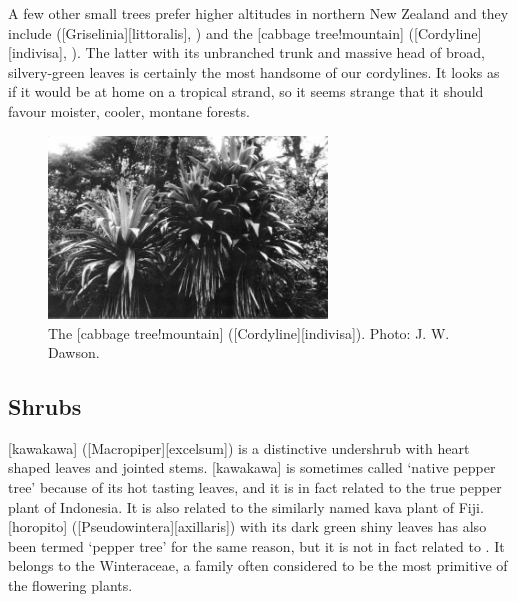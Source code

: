 A few other small trees prefer higher altitudes in northern New Zealand and they include  ([Griselinia][littoralis], ) and the [cabbage tree!mountain] ([Cordyline][indivisa], ).
The latter with its unbranched trunk and massive head of broad, silvery-green leaves is certainly the most handsome of our cordylines.
It looks as if it would be at home on a tropical strand, so it seems strange that it should favour moister, cooler, montane forests.

\begin{figure}
	\includegraphics[width=0.66\textwidth]{graphics/fig_061}
	\centering
	\caption[The mountain cabbage tree]{The [cabbage tree!mountain] ([Cordyline][indivisa]).
	Photo: J. W. Dawson.}%
	\label{fig:61cabbagetree}
\end{figure}

\subsection{Shrubs}

[kawakawa] ([Macropiper][excelsum]) is a distinctive undershrub with heart shaped leaves and jointed stems.
[kawakawa] is sometimes called `native pepper tree' because of its hot tasting leaves, and it is in fact related to the true pepper plant of Indonesia.
It is also related to the similarly named kava plant of Fiji.
[horopito] ([Pseudowintera][axillaris]) with its dark green shiny leaves has also been termed `pepper tree' for the same reason, but it is not in fact related to .
It belongs to the Winteraceae, a family often considered to be the most primitive of the flowering plants.

